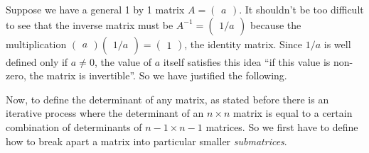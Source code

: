 Suppose we have a general 1 by 1 matrix $A = \begin{pmatrix} a \end{pmatrix}$. It shouldn't be too difficult to see that the inverse matrix must be $A^{-1} = \begin{pmatrix} 1/a \end{pmatrix}$ because the multiplication $\begin{pmatrix} a \end{pmatrix}\begin{pmatrix} 1/a \end{pmatrix} = \begin{pmatrix} 1 \end{pmatrix}$, the identity matrix. Since $1/a$ is well defined only if $a\neq 0$, the value of $a$ itself satisfies this idea ``if this value is non-zero, the matrix is invertible''. So we have justified the following.


Now, to define the determinant of any matrix, as stated before there is an iterative process where the determinant of an $n\times n$ matrix is equal to a certain combination of determinants of $n-1 \times n-1$ matrices. So we first have to define how to break apart a matrix into particular smaller \textit{submatrices}.

